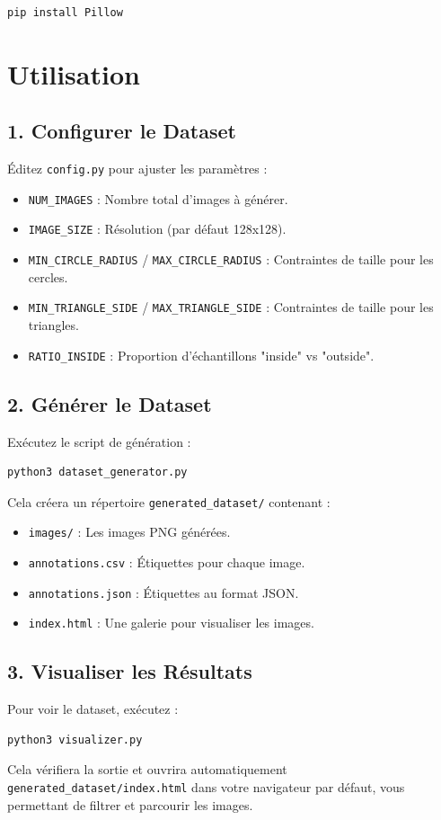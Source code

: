 \begin{verbatim}
pip install Pillow
\end{verbatim}

\section{Utilisation}

\subsection{1. Configurer le Dataset}
\'Editez \texttt{config.py} pour ajuster les param\`etres :
\begin{itemize}
    \item \texttt{NUM\_IMAGES} : Nombre total d'images \`a g\'en\'erer.
    \item \texttt{IMAGE\_SIZE} : R\'esolution (par d\'efaut 128x128).
    \item \texttt{MIN\_CIRCLE\_RADIUS} / \texttt{MAX\_CIRCLE\_RADIUS} : Contraintes de taille pour les cercles.
    \item \texttt{MIN\_TRIANGLE\_SIDE} / \texttt{MAX\_TRIANGLE\_SIDE} : Contraintes de taille pour les triangles.
    \item \texttt{RATIO\_INSIDE} : Proportion d'\'echantillons "inside" vs "outside".
\end{itemize}

\subsection{2. G\'en\'erer le Dataset}
Ex\'ecutez le script de g\'en\'eration :

\begin{verbatim}
python3 dataset_generator.py
\end{verbatim}

Cela cr\'eera un r\'epertoire \texttt{generated\_dataset/} contenant :
\begin{itemize}
    \item \texttt{images/} : Les images PNG g\'en\'er\'ees.
    \item \texttt{annotations.csv} : \'Etiquettes pour chaque image.
    \item \texttt{annotations.json} : \'Etiquettes au format JSON.
    \item \texttt{index.html} : Une galerie pour visualiser les images.
\end{itemize}

\subsection{3. Visualiser les R\'esultats}
Pour voir le dataset, ex\'ecutez :

\begin{verbatim}
python3 visualizer.py
\end{verbatim}

Cela v\'erifiera la sortie et ouvrira automatiquement \texttt{generated\_dataset/index.html} dans votre navigateur par d\'efaut, vous permettant de filtrer et parcourir les images.
